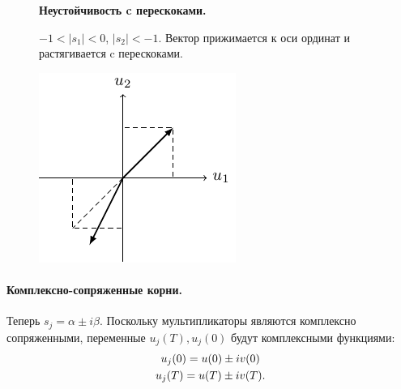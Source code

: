 \begin{figure}[H]
	\centering
	\begin{minipage}{0.65\linewidth}
		\textbf{Неустойчивость c перескоками. } 

		$-1<|s_1|<0$, $|s_2|<-1$. Вектор прижимается к оси ординат и растягивается c перескоками.
	\end{minipage}
	\begin{minipage}{0.34\linewidth}
		\centering
		\includegraphics[scale=1.5]{img/parametric_oscillations/sj_4}   
	\end{minipage}		
\end{figure}


\paragraph{Комплексно-сопряженные корни. } Теперь $s_j=\alpha \pm i\beta$. Поскольку мультипликаторы являются комплексно сопряженными, переменные $u_j(T), u_j(0)$ будут комплексными функциями:
\begin{gather}
	u_j(0)=u(0)\pm iv(0) \notag \\ 
	u_j(T)=u(T)\pm iv(T).		
	\label{eq:71}
\end{gather}

